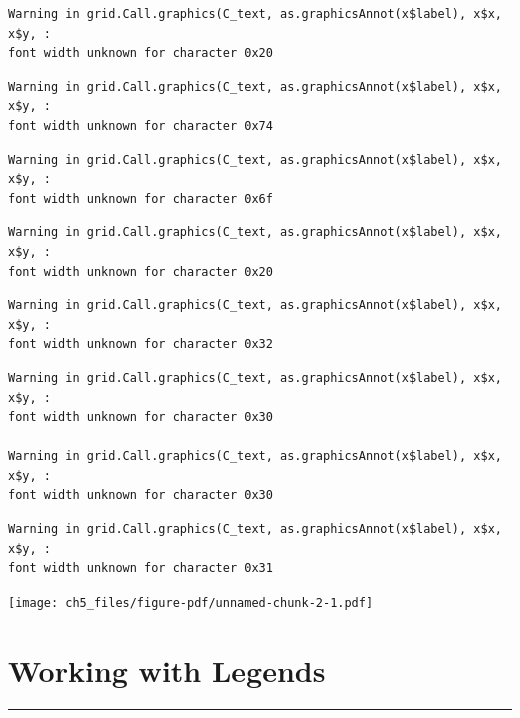\documentclass[
  letterpaper,
  DIV=11,
  numbers=noendperiod]{scrreprt}
\begin{document}
\begin{verbatim}
Warning in grid.Call.graphics(C_text, as.graphicsAnnot(x$label), x$x, x$y, :
font width unknown for character 0x20
\end{verbatim}

\begin{verbatim}
Warning in grid.Call.graphics(C_text, as.graphicsAnnot(x$label), x$x, x$y, :
font width unknown for character 0x74
\end{verbatim}

\begin{verbatim}
Warning in grid.Call.graphics(C_text, as.graphicsAnnot(x$label), x$x, x$y, :
font width unknown for character 0x6f
\end{verbatim}

\begin{verbatim}
Warning in grid.Call.graphics(C_text, as.graphicsAnnot(x$label), x$x, x$y, :
font width unknown for character 0x20
\end{verbatim}

\begin{verbatim}
Warning in grid.Call.graphics(C_text, as.graphicsAnnot(x$label), x$x, x$y, :
font width unknown for character 0x32
\end{verbatim}

\begin{verbatim}
Warning in grid.Call.graphics(C_text, as.graphicsAnnot(x$label), x$x, x$y, :
font width unknown for character 0x30

Warning in grid.Call.graphics(C_text, as.graphicsAnnot(x$label), x$x, x$y, :
font width unknown for character 0x30
\end{verbatim}

\begin{verbatim}
Warning in grid.Call.graphics(C_text, as.graphicsAnnot(x$label), x$x, x$y, :
font width unknown for character 0x31
\end{verbatim}

\texttt{[image: ch5\_files/figure-pdf/unnamed-chunk-2-1.pdf]}


\chapter{Working with Legends}\label{legends}

\begin{center}\rule{0.5\linewidth}{0.5pt}\end{center}
\end{document}
